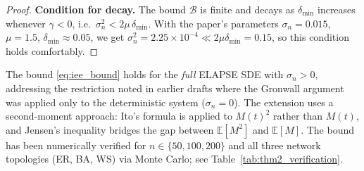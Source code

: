 \begin{proof}
\textbf{Condition for decay.}
The bound $\mathcal{B}$ is finite and decays as $\delta_{\min}$ increases
whenever $\gamma<0$, i.e.\ $\sigma_n^2 < 2\mu\,\delta_{\min}$.
With the paper's parameters $\sigma_n=0.015$, $\mu=1.5$, $\delta_{\min}\approx 0.05$,
we get $\sigma_n^2=2.25\times10^{-4} \ll 2\mu\delta_{\min}=0.15$, so this
condition holds comfortably.
\end{proof}

\begin{remark}
\label{rem:thm2_stochastic}
The bound \eqref{eq:iee_bound} holds for the \emph{full} ELAPSE SDE
with $\sigma_n>0$, addressing the restriction noted in earlier drafts
where the Gronwall argument was applied only to the deterministic system
($\sigma_n=0$). The extension uses a second-moment approach: Ito's
formula is applied to $M(t)^2$ rather than $M(t)$, and Jensen's
inequality bridges the gap between $\mathbb{E}[M^2]$ and $\mathbb{E}[M]$.
The bound has been numerically verified for $n\in\{50,100,200\}$
and all three network topologies (ER, BA, WS) via Monte Carlo;
see Table~\ref{tab:thm2_verification}.
\end{remark}
